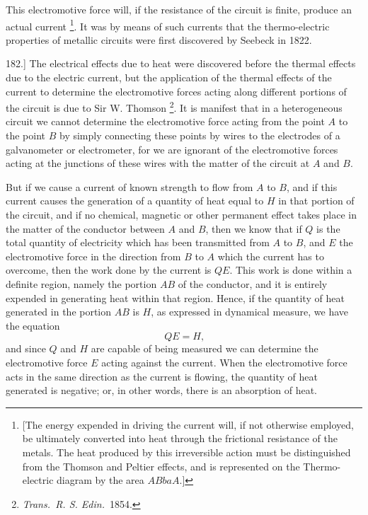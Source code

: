 \documentclass[12pt,oneside]{book}[2021/10/04]
\let\oldfootnote\footnote
\renewcommand\footnote[1]{%
\oldfootnote{\hspace{0.14em}#1}}
\newcommand{\Runhead}[1]{\fancyhead[C]{\iffloatpage{}{\small#1}}}
\newcommand{\article}[1]{\phantomsection \label{art:#1}{#1.]}}
\newcommand{\¬}{\hphantom{0}}
\begin{document}
This electromotive force will, if the resistance of the circuit is
finite, produce an actual current\footnote{
[The energy expended in driving the current will, if not otherwise employed, be
ultimately converted into heat through the frictional resistance of the metals. The
heat produced by this irreversible action must be distinguished from the Thomson
and Peltier effects, and is represented on the Thermo-electric diagram by the area
\(ABbaA\).]}. It was by means of such
currents that the thermo-electric properties of metallic circuits
were first discovered by Seebeck in 1822.

\article{182} The electrical effects due to heat were discovered before
the thermal effects due to the electric current, but the application
of the thermal effects of the current to determine the electromotive
forces acting along different portions of the circuit is due to Sir
W. Thomson\footnote{
\textit{Trans.\ R. S. Edin.}\ 1854.}. It is manifest that in a heterogeneous circuit
we cannot determine the electromotive force acting from the point
\(A\) to the point \(B\) by simply connecting these points by wires to the
electrodes of a galvanometer or electrometer, for we are ignorant of
the electromotive forces acting at the junctions of these wires with
the matter of the circuit at \(A\) and \(B\).
\Runhead{MEASUREMENT OF ELECTROMOTIVE FORCE.}

But if we cause a current of known strength to flow from \(A\) to \(B\),
and if this current causes the generation of a quantity of heat equal
to \(H\) in that portion of the circuit, and if no chemical, magnetic or
other permanent effect takes place in the matter of the conductor
between \(A\) and \(B\), then we know that if \(Q\) is the total quantity of
electricity which has been transmitted from \(A\) to \(B\), and \(E\) the
electromotive force in the direction from \(B\) to \(A\) which the current
has to overcome, then the work done by the current is \(QE\). This
work is done within a definite region, namely the portion \(AB\) of
the conductor, and it is entirely expended in generating heat within
that region. Hence, if the quantity of heat generated in the
portion \(AB\) is \(H\), as expressed in dynamical measure, we have the
equation
\[
QE = H\text{,}
\]
and since \(Q\) and \(H\) are capable of being measured we can determine
the electromotive force \(E\) acting against the current. When the
electromotive force acts in the same direction as the current is
flowing, the quantity of heat generated is negative; or, in other
words, there is an absorption of heat.
\end{document}
